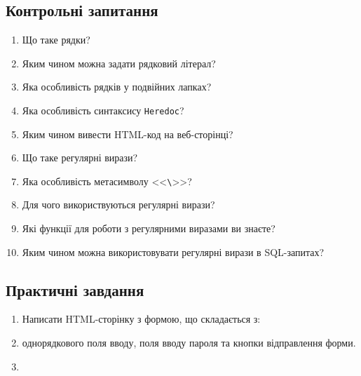 \subsection*{Контрольні запитання}
\nopagebreak[4]
\begin{enumerate}
\item Що таке рядки?
\item Яким чином можна задати рядковий літерал?
\item Яка особливість рядків у подвійних лапках?
\item Яка особливість синтаксису \verb'Heredoc'? 
\item Яким чином вивести HTML-код на веб-сторінці?
\item Що таке регулярні вирази?
\item Яка особливість метасимволу <<\verb'\'>>?
\item Для чого використвуються регулярні вирази?
\item Які функції для роботи з регулярними виразами ви знаєте?
\item Яким чином можна використовувати регулярні вирази в SQL-запитах?
\end{enumerate}

\subsection*{Практичні завдання}
\nopagebreak[4]


\begin{enumerate}
\item[]Написати HTML-сторінку з формою, що складається з:
\item однорядкового поля вводу, поля вводу пароля та кнопки відправлення форми.
\item 

\end{enumerate}
